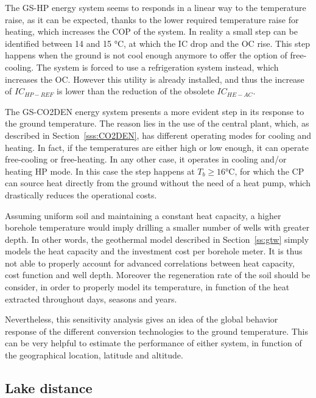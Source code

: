 \documentclass{article}
\begin{document}
The GS-HP energy system seems to responds in a linear way to the temperature raise, as it can be expected, thanks to the lower required temperature raise for heating, which increases the COP of the system. In reality a small step can be identified between 14 and 15 \si{\celsius}, at which the IC drop and the OC rise. This step happens when the ground is not cool enough anymore to offer the option of free-cooling. The system is forced to use a refrigeration system instead, which increases the OC. However this utility is already installed, and thus the increase of $IC_{HP-REF}$ is lower than the reduction of the obsolete $IC_{HE-AC}$.

The GS-CO2DEN energy system presents a more evident step in its response to the ground temperature. The reason lies in the use of the central plant, which, as described in Section~\ref{sss:CO2DEN}, has different operating modes for cooling and heating. In fact, if the temperatures are either high or low enough, it can operate free-cooling or free-heating. In any other case, it operates in cooling and/or heating HP mode. In this case the step happens at $T_{b} \geq 16 \si{\celsius}$, for which the CP can source heat directly from the ground without the need of a heat pump, which drastically reduces the operational costs.

Assuming uniform soil and maintaining a constant heat capacity, a higher borehole temperature would imply drilling a smaller number of wells with greater depth. In other words, the geothermal model described in Section~\ref{ss:gtw} simply models the heat capacity and the investment cost per borehole meter. It is thus not able to properly account for advanced correlations between heat capacity, cost function and well depth. Moreover the regeneration rate of the soil should be consider, in order to properly model its temperature, in function of the heat extracted throughout days, seasons and years.

Nevertheless, this sensitivity analysis gives an idea of the global behavior response of the different conversion technologies to the ground temperature. This can be very helpful to estimate the performance of either system, in function of the geographical location, latitude and altitude.


\subsection{Lake distance}

%
\end{document}
